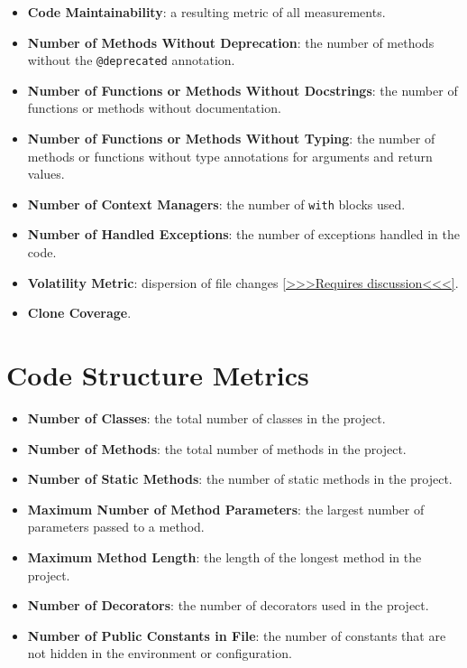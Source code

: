 \documentclass{article}
\begin{document}
\begin{itemize}
    \item \textbf{Code Maintainability}: a resulting metric of all measurements.
    \item \textbf{Number of Methods Without Deprecation}: the number of methods without the \texttt{@deprecated} annotation.
    \item \textbf{Number of Functions or Methods Without Docstrings}: the number of functions or methods without documentation.
    \item \textbf{Number of Functions or Methods Without Typing}: the number of methods or functions without type annotations for arguments and return values.
    \item \textbf{Number of Context Managers}: the number of \texttt{with} blocks used.
    \item \textbf{Number of Handled Exceptions}: the number of exceptions handled in the code.
    \item \textbf{Volatility Metric}: dispersion of file changes \href{https://youtu.be/zN0gX9m6a2k?si=ACzi11hjNT9S82Qu&t=1956}{[>>>Requires discussion<<<]}.
    \item \textbf{Clone Coverage}.
\end{itemize}

\section{Code Structure Metrics}

\begin{itemize}
    \item \textbf{Number of Classes}: the total number of classes in the project.
    \item \textbf{Number of Methods}: the total number of methods in the project.
    \item \textbf{Number of Static Methods}: the number of static methods in the project.
    \item \textbf{Maximum Number of Method Parameters}: the largest number of parameters passed to a method.
    \item \textbf{Maximum Method Length}: the length of the longest method in the project.
    \item \textbf{Number of Decorators}: the number of decorators used in the project.
    \item \textbf{Number of Public Constants in File}: the number of constants that are not hidden in the environment or configuration.
\end{itemize}
\end{document}
